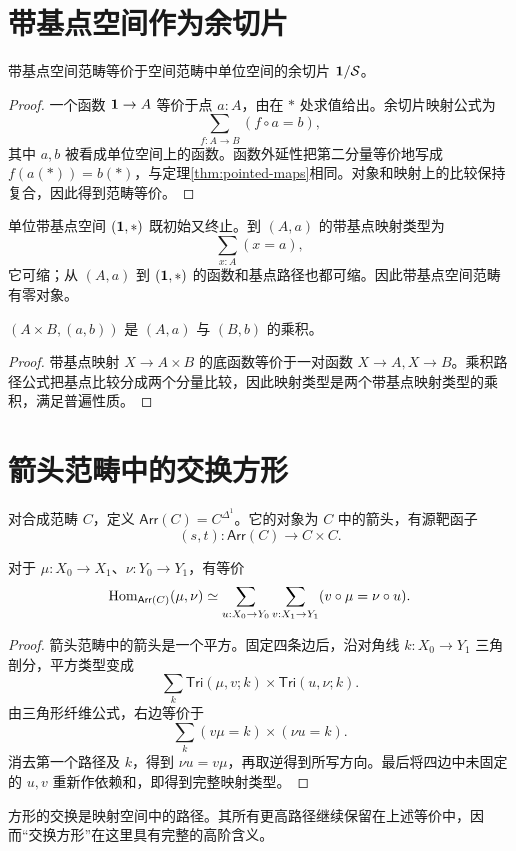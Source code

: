 \section{带基点空间作为余切片}
\begin{proposition}
带基点空间范畴等价于空间范畴中单位空间的余切片 $\mathbf 1/\mathcal S$。
\end{proposition}
\begin{proof}
一个函数 $\mathbf 1\to A$ 等价于点 $a:A$，由在 $*$ 处求值给出。余切片映射公式为
\[
\sum_{f:A\to B}(f\circ a=b),
\]
其中 $a,b$ 被看成单位空间上的函数。函数外延性把第二分量等价地写成 $f(a(*))=b(*)$，与定理\ref{thm:pointed-maps}相同。对象和映射上的比较保持复合，因此得到范畴等价。
\end{proof}
\begin{example}
单位带基点空间 $(\mathbf 1,*)$ 既初始又终止。到 $(A,a)$ 的带基点映射类型为
\[
\sum_{x:A}(x=a),
\]
它可缩；从 $(A,a)$ 到 $(\mathbf 1,*)$ 的函数和基点路径也都可缩。因此带基点空间范畴有零对象。
\end{example}
\begin{proposition}[带基点乘积]
$(A\times B,(a,b))$ 是 $(A,a)$ 与 $(B,b)$ 的乘积。
\end{proposition}
\begin{proof}
带基点映射 $X\to A\times B$ 的底函数等价于一对函数 $X\to A,X\to B$。乘积路径公式把基点比较分成两个分量比较，因此映射类型是两个带基点映射类型的乘积，满足普遍性质。
\end{proof}

\section{箭头范畴中的交换方形}
\begin{definition}[箭头范畴]
对合成范畴 $C$，定义 $\mathsf{Arr}(C)=C^{\Delta^1}$。它的对象为 $C$ 中的箭头，有源靶函子
\[
(s,t):\mathsf{Arr}(C)\to C\times C.
\]
\end{definition}
\begin{lemma}[方形类型]\label{lem:arrow-square}
对于 $\mu:X_0\to X_1$、$\nu:Y_0\to Y_1$，有等价
\[
\operatorname{Hom}_{\mathsf{Arr}(C)}(\mu,\nu)
\simeq
\sum_{u:X_0\to Y_0}\sum_{v:X_1\to Y_1}
(v\circ\mu=\nu\circ u).
\]
\end{lemma}
\begin{proof}
箭头范畴中的箭头是一个平方。固定四条边后，沿对角线 $k:X_0\to Y_1$ 三角剖分，平方类型变成
\[
\sum_k\mathsf{Tri}(\mu,v;k)\times\mathsf{Tri}(u,\nu;k).
\]
由三角形纤维公式，右边等价于
\[
\sum_k(v\mu=k)\times(\nu u=k).
\]
消去第一个路径及 $k$，得到 $\nu u=v\mu$，再取逆得到所写方向。最后将四边中未固定的 $u,v$ 重新作依赖和，即得到完整映射类型。
\end{proof}
\begin{remark}
方形的交换是映射空间中的路径。其所有更高路径继续保留在上述等价中，因而“交换方形”在这里具有完整的高阶含义。
\end{remark}

